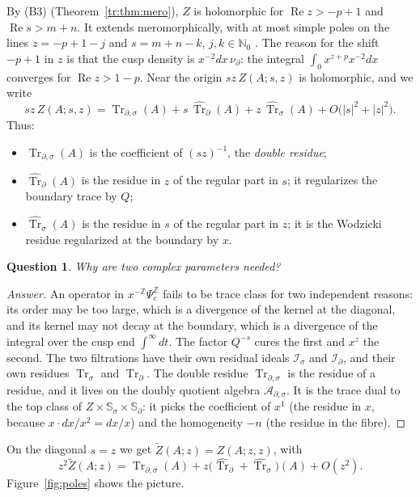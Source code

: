 \documentclass[11pt,oneside,reqno]{article}
\DeclareMathOperator{\Tr}{Tr}
\newcommand{\Z}{\mathbb Z}
\newcommand{\N}{\mathbb N}
\newcommand{\Is}{\mathcal I_\sigma}
\newcommand{\Id}{\mathcal I_\partial}
\newcommand{\Ads}{\mathcal A_{\partial,\sigma}}
\newcommand{\Psic}{\Psi_{c}}
\newcommand{\Trs}{\Tr_\sigma}
\newcommand{\Trd}{\Tr_\partial}
\newcommand{\Trds}{\Tr_{\partial,\sigma}}
\newcommand{\hTrs}{\widehat{\Tr}_\sigma}
\newcommand{\hTrd}{\widehat{\Tr}_\partial}
\newcommand{\Ssig}{\mathbb S_\sigma}
\newcommand{\Sd}{\mathbb S_\partial}
\theoremstyle{plain}
\newtheorem{question}[theorem]{Question}
\theoremstyle{definition}
\theoremstyle{remark}
\newenvironment{answer}{\begin{proof}[Answer]}{\end{proof}}
\begin{document}
By (B3) (Theorem~\ref{tr:thm:mero}), \(Z\) is holomorphic for
\(\operatorname{Re}z>-p+1\) and \(\operatorname{Re}s>m+n\). It extends meromorphically, with at most
simple poles on the lines \(z=-p+1-j\) and \(s=m+n-k\), \(j,k\in\N_0\)
\cite[Lemma~4]{MN}. The reason for the shift \(-p+1\) in \(z\) is that the
cusp density is \(x^{-2}dx\,\nu_\partial\): the integral \(\int_0x^{z+p}
x^{-2}dx\) converges for \(\operatorname{Re}z>1-p\). Near the origin
\(sz\,Z(A;s,z)\) is holomorphic, and we write \cite[(44)]{MN}
\begin{equation}\label{eq:44}
 sz\,Z(A;s,z)=\Trds(A)+s\,\hTrd(A)+z\,\hTrs(A)+O\bigl(|s|^2+|z|^2\bigr).
\end{equation}
Thus:
\begin{itemize}
\item \(\Trds(A)\) is the coefficient of \((sz)^{-1}\), the \emph{double
residue};
\item \(\hTrd(A)\) is the residue in \(z\) of the regular part in \(s\);
it regularizes the boundary trace by \(Q\);
\item \(\hTrs(A)\) is the residue in \(s\) of the regular part in \(z\);
it is the Wodzicki residue regularized at the boundary by \(x\).
\end{itemize}
\begin{question}
Why are two complex parameters needed?
\end{question}
\begin{answer}
An operator in \(x^{-\Z}\Psic^{\Z}\) fails to be trace class for two
independent reasons: its order may be too large, which is a divergence
of the kernel at the diagonal, and its kernel may not decay at the
boundary, which is a divergence of the integral over the cusp end
\(\int^\infty dt\). The factor \(Q^{-s}\) cures the first and \(x^z\) the
second. The two filtrations have their own residual ideals \(\Is\) and
\(\Id\), and their own residues \(\Trs\) and \(\Trd\). The double residue
\(\Trds\) is the residue of a residue, and it lives on the doubly
quotient algebra \(\Ads\). It is the trace dual to the top class of
\(Z\times\Ssig\times\Sd\): it picks the coefficient of \(x^1\) (the residue
in \(x\), because \(x\cdot dx/x^2=dx/x\)) and the homogeneity \(-n\) (the
residue in the fibre).
\end{answer}

On the diagonal \(s=z\) we get \(\widetilde Z(A;z)=Z(A;z,z)\), with
\[
 z^2\widetilde Z(A;z)=\Trds(A)+z\bigl(\hTrd+\hTrs\bigr)(A)+O(z^2).
\]
Figure~\ref{fig:poles} shows the picture.
\end{document}
